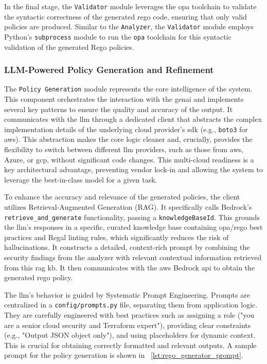 In the final stage, the \texttt{Validator} module leverages the \gls{opa} toolchain to validate the syntactic correctness of the generated \gls{rego} code, ensuring that only valid policies are produced. Similar to the \texttt{Analyzer}, the \texttt{Validator} module employs Python's \texttt{subprocess} module to run the \texttt{opa} toolchain for this syntactic validation of the generated Rego policies.

\subsubsection{LLM-Powered Policy Generation and Refinement}

The \texttt{Policy Generation} module represents the core intelligence of the system. This component orchestrates the interaction with the \gls{genai} and implements several key patterns to ensure the quality and accuracy of the output. It communicates with the \gls{llm} through a dedicated client that abstracts the complex implementation details of the underlying cloud provider's \gls{sdk} (e.g., \texttt{boto3} for \gls{aws}). This abstraction makes the core logic cleaner and, crucially, provides the flexibility to switch between different \gls{llm} providers, such as those from \gls{aws}, Azure, or \gls{gcp}, without significant code changes. This multi-cloud readiness is a key architectural advantage, preventing vendor lock-in and allowing the system to leverage the best-in-class model for a given task.

To enhance the accuracy and relevance of the generated policies, the client utilizes Retrieval-Augmented Generation (RAG). It specifically calls Bedrock's \texttt{retrieve\_and\_generate} functionality, passing a \texttt{knowledgeBaseId}. This grounds the \gls{llm}'s responses in a specific, curated knowledge base containing \gls{opa}/\gls{rego} best practices and Regal linting rules, which significantly reduces the risk of hallucinations. It constructs a detailed, context-rich prompt by combining the security findings from the analyzer with relevant contextual information retrieved from this \gls{rag} \gls{kb}. It then communicates with the \gls{aws} Bedrock \gls{api} to obtain the generated \gls{rego} policy.

The \gls{llm}'s behavior is guided by Systematic Prompt Engineering. Prompts are centralized in a \texttt{config/prompts.py} file, separating them from application logic. They are carefully engineered with best practices such as assigning a role ("you are a senior cloud security and Terraform expert"), providing clear constraints (e.g., "Output JSON object only"), and using placeholders for dynamic context. This is crucial for obtaining correctly formatted and relevant outputs. A sample prompt for the policy generation is shown in ~\ref{lst:rego_generator_prompt}.

